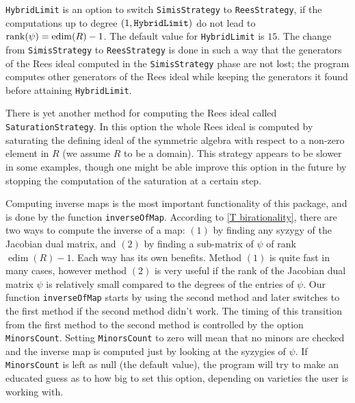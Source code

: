 \documentclass[11pt]{amsart}
\numberwithin{equation}{theorem}
\renewcommand{\:}{\colon}
\DeclareMathOperator{\edim}{edim}
\theoremstyle{theorem}
\begin{document}
{\tt HybridLimit} is an option to switch   {\tt SimisStrategy} to  {\tt{ReesStrategy}}, if the computations up to degree $(1, \tt{HybridLimit})$ do not lead to   ${\rm rank}(\psi)=\edim(R)-1$.
The default value for {\tt HybridLimit} is $15$. The change from  {\tt SimisStrategy} to  {\tt ReesStrategy} is done in such a way that the generators of the Rees ideal computed in the { \tt SimisStrategy} phase are not lost; the program computes other generators of the Rees ideal while keeping the generators it found before attaining {\tt HybridLimit}.

There is yet another method for computing the Rees ideal called {\tt SaturationStrategy}. In this option the whole Rees ideal is computed by saturating the defining ideal of the symmetric algebra with respect to a non-zero element in $R$ (we assume $R$ to be a domain). This strategy appears to be slower in some examples, though one might be able improve this option in the future by stopping the computation of the saturation at a certain step.

Computing inverse maps is the most important functionality of this package, and is done by the function {\tt inverseOfMap}. According to \autoref{T birationality}, there are two ways to compute the inverse of a map: $(1)$ by finding any syzygy of the Jacobian dual matrix, and $(2)$ by finding a sub-matrix of $\psi$ of rank $\edim(R)-1$. Each way has its own benefits. Method $(1)$ is quite fast in many cases, however method $(2)$ is very useful if the rank of the Jacobian dual matrix  $\psi$ is relatively small compared to the degrees of the entries of $\psi$. Our function {\tt inverseOfMap} starts by using the second method and later switches to the first method if the second method didn't work.  The timing of this transition from the first method to the second method is controlled by the option {\tt MinorsCount}. Setting {\tt MinorsCount} to zero will mean that no minors are checked and the inverse map is computed just by looking at the syzygies of $\psi$.  If {\tt MinorsCount} is left as null (the default value), the program will try to make an educated guess as to how big to set this option, depending on varieties the user is working with.
\end{document}
